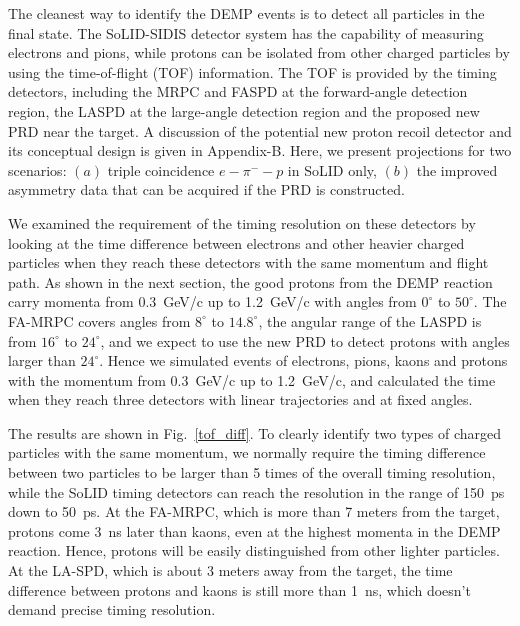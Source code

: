 The cleanest way to identify the DEMP events is to detect all particles in the
final state. The SoLID-SIDIS detector system has the capability of measuring
electrons and pions, while protons can be isolated from other charged particles
by using the time-of-flight (TOF) information. The TOF is provided by the timing
detectors, including the MRPC and FASPD at the forward-angle detection region,
the LASPD at the large-angle detection region and the proposed new PRD near the
target. A discussion of the potential new proton recoil detector and its
conceptual design is given in Appendix-B.  Here, we present
projections for two scenarios: $(a)$ triple coincidence $e-\pi^--p$ in SoLID
only, $(b)$ the improved asymmetry data that can be acquired if the PRD is
constructed.

We examined the requirement of the timing resolution on these detectors by
looking at the time difference between electrons and other heavier charged
particles when they reach these detectors with the same momentum and flight
path. As shown in the next section, the good protons from the DEMP reaction
carry momenta from 0.3~GeV/c up to 1.2~GeV/c with angles from
$0^{\circ}$ to $50^{\circ}$. The FA-MRPC covers angles from
$8^{\circ}$ to $14.8^{\circ}$, the angular range of the LASPD is from
$16^{\circ}$ to $24^{\circ}$, and we expect to use the new PRD to detect
protons with angles larger than $24^{\circ}$.  Hence we simulated
events of electrons, pions, kaons and protons with the momentum from
0.3~GeV/c up to 1.2~GeV/c, and calculated the time when they reach three
detectors with linear trajectories and at fixed angles.

The results are shown in Fig.~\ref{tof_diff}. To clearly identify two types of
charged particles with the same momentum, we normally require the timing
difference between two particles to be larger than 5 times of the overall
timing resolution, while the SoLID timing detectors can reach the resolution
in the range of 150~ps down to 50~ps.  At the FA-MRPC, which is more than 7
meters from the target, protons come 3~ns later than kaons, even at the
highest momenta in the DEMP reaction. Hence, protons will be easily distinguished
from other lighter particles.  At the LA-SPD, which is about 3 meters away from
the target, the time difference between protons and kaons is still more than
1~ns, which doesn't demand precise timing resolution.

